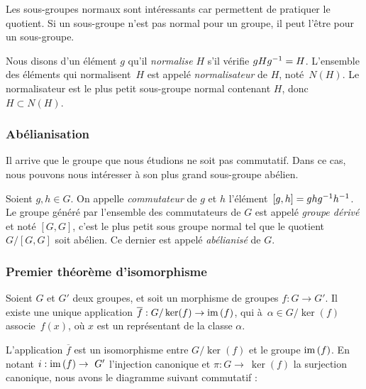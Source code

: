 Les sous-groupes normaux sont intéressants car permettent de pratiquer le quotient. Si un sous-groupe n'est pas normal pour un groupe, il peut l'être pour un sous-groupe.

\begin{definition}\label{def:normalizer}
Nous disons d'un élément $g$ qu'il \emph{normalise} $H$ s'il vérifie $gHg^{-1}=H$. L'ensemble des éléments qui normalisent~$H$ est appelé \emph{normalisateur} de $H$, noté~$N(H)$. Le normalisateur est le plus petit sous-groupe normal contenant $H$, donc $H\subset N(H)$.
\end{definition}

\subsubsection{Abélianisation}

Il arrive que le groupe que nous étudions ne soit pas commutatif. Dans ce cas, nous pouvons nous intéresser à son plus grand sous-groupe abélien.

\begin{definition}
Soient $g,h\in G$. On appelle \emph{commutateur} de $g$ et $h$ l'élément~$[g,h]=ghg^{-1} h^{-1}$. Le groupe généré par l'ensemble des commutateurs de $G$ est appelé \emph{groupe dérivé} et noté $[G,G]$, c'est le plus petit sous groupe normal tel que le quotient $G/[G,G]$ soit abélien. Ce dernier est appelé \emph{abélianisé} de $G$.
\end{definition}

\subsubsection{Premier théorème d'isomorphisme}

\begin{theorem}
Soient $G$ et $G'$ deux groupes, et soit un morphisme de groupes $f:G\to G'$. Il existe une unique application $\overline{f}:G/\ker(f)\to \mathrm{im}\,(f)$, qui à~$\alpha\in G/\ker(f)$ associe~$f(x)$, où $x$ est un représentant de la classe $\alpha$.

L'application $\overline{f}$ est un isomorphisme entre $G/\ker(f)$ et le groupe $\mathrm{im}\,(f)$. En notant $i:\mathrm{im}\,(f)\to~G'$ l'injection canonique et $\pi:G\to~\ker(f)$ la surjection canonique, nous avons le diagramme suivant commutatif :
\begin{figure}[H]
    \centering
\end{figure}
\end{theorem}

